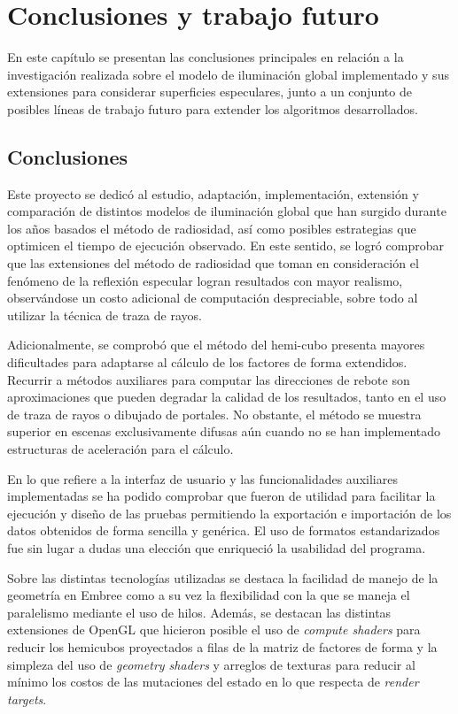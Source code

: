 \chapter{Conclusiones y trabajo futuro}
\label{ch:chap06}

En este capítulo se presentan las conclusiones principales en relación a la investigación realizada sobre el modelo de iluminación global implementado y sus extensiones para considerar superficies especulares, junto a un conjunto de posibles líneas de trabajo futuro para extender los algoritmos desarrollados.

\section{Conclusiones}
\label{sec:conclusiones}

Este proyecto se dedicó al estudio, adaptación, implementación, extensión y comparación de distintos modelos de iluminación global que han surgido durante los años basados el método de radiosidad, así como posibles estrategias que optimicen el tiempo de ejecución observado. En este sentido, se logró comprobar que las extensiones del método de radiosidad que toman en consideración el fenómeno de la reflexión especular logran resultados con mayor realismo, observándose un costo adicional de computación despreciable, sobre todo al utilizar la técnica de traza de rayos.

Adicionalmente, se comprobó que el método del hemi-cubo presenta mayores dificultades para adaptarse al cálculo de los factores de forma extendidos. Recurrir a métodos auxiliares para computar las direcciones de rebote son aproximaciones que pueden degradar la calidad de los resultados, tanto en el uso de traza de rayos o dibujado de portales. No obstante, el método se muestra superior en escenas exclusivamente difusas aún cuando no se han implementado estructuras de aceleración para el cálculo.

En lo que refiere a la interfaz de usuario y las funcionalidades auxiliares implementadas se ha podido comprobar que fueron de utilidad para facilitar la ejecución y diseño de las pruebas permitiendo la exportación e importación de los datos obtenidos de forma sencilla y genérica. El uso de formatos estandarizados fue sin lugar a dudas una elección que enriqueció la usabilidad del programa.

Sobre las distintas tecnologías utilizadas se destaca la facilidad de manejo de la geometría en Embree como a su vez la flexibilidad con la que se maneja el paralelismo mediante el uso de hilos. Además, se destacan las distintas extensiones de OpenGL que hicieron posible el uso de \textit{compute shaders} para reducir los hemicubos proyectados a filas de la matriz de factores de forma y la simpleza del uso de \textit{geometry shaders} y arreglos de texturas para reducir al mínimo los costos de las mutaciones del estado en lo que respecta de \textit{render targets}.

